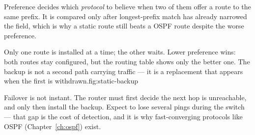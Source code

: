 \begin{keyidea}
Preference decides which \emph{protocol} to believe when two of them
offer a route to the same prefix. It is compared only after longest-prefix
match has already narrowed the field, which is why a  static
route still beats a  OSPF route despite the worse preference.
\end{keyidea}

\begin{utpfig}{Only one route is installed at a time; the other waits. Lower preference wins: both routes stay configured, but the routing table shows only the better one. The backup is not a second path carrying traffic --- it is a replacement that appears when the first is withdrawn.}{fig:static-backup}
\end{utpfig}

\begin{pitfall}
Failover is not instant. The router must first decide the next hop is unreachable, and only then install the backup. Expect to lose several pings during the switch --- that gap is the cost of detection, and it is why fast-converging protocols like OSPF (Chapter~\ref{ch:ospf}) exist.
\end{pitfall}

